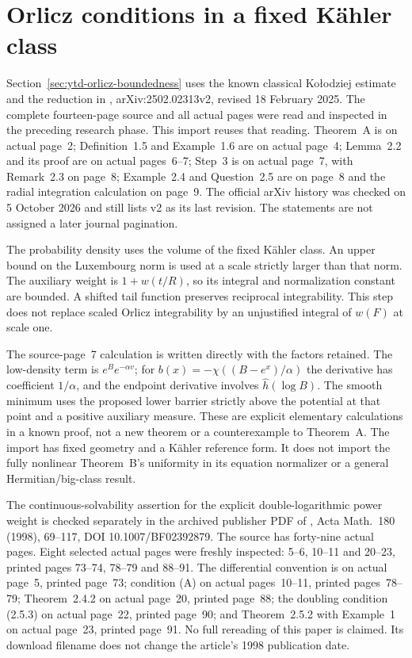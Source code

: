 \section{Orlicz conditions in a fixed K\"ahler class}
\label{sec:provenance-orlicz-K}

Section~\ref{sec:ytd-orlicz-boundedness} uses the known classical
Ko\l odziej estimate and the reduction in
\cite{GuedjLu25FromYauV2}, arXiv:2502.02313v2, revised
18 February 2025. The complete fourteen-page source and all actual
pages were read and inspected in the preceding research phase.
This import reuses that reading. Theorem~A is on actual page~2;
Definition~1.5 and Example~1.6 are on actual page~4;
Lemma~2.2 and its proof are on actual pages~6--7;
Step~3 is on actual page~7, with Remark~2.3 on page~8;
Example~2.4 and Question~2.5 are on page~8 and the radial
integration calculation on page~9. The official arXiv history
was checked on 5 October 2026 and still lists v2 as its last revision.
The statements are not assigned a later journal pagination.

The probability density uses the volume of the fixed K\"ahler class.
An upper bound on the Luxembourg norm is used at a scale strictly
larger than that norm. The auxiliary weight is $1+w(t/R)$, so
its integral and normalization constant are bounded. A shifted
tail function preserves reciprocal integrability. This step does
not replace scaled Orlicz integrability by an unjustified integral
of $w(F)$ at scale one.

The source-page~7 calculation is written directly with the factors
retained. The low-density term is $e^Be^{-\alpha v}$;
for $b(x)=-\chi((B-e^x)/\alpha)$ the derivative has coefficient
$1/\alpha$, and the endpoint derivative involves
$\widehat h(\log B)$. The smooth minimum uses the proposed lower
barrier strictly above the potential at that point and a positive
auxiliary measure. These are explicit elementary calculations in
a known proof, not a new theorem or a counterexample to Theorem~A.
The import has fixed geometry and a K\"ahler reference form.
It does not import the fully nonlinear Theorem~B's uniformity in
its equation normalizer or a general Hermitian/big-class result.

The continuous-solvability assertion for the explicit
double-logarithmic power weight is checked separately in the archived
publisher PDF of \cite{Kol98}, Acta Math.\ 180 (1998), 69--117,
DOI 10.1007/BF02392879. The source has forty-nine actual pages.
Eight selected actual pages were freshly inspected: 5--6,
10--11 and 20--23, printed pages 73--74, 78--79 and 88--91.
The differential convention is on actual page~5, printed page~73;
condition (A) on actual pages~10--11, printed pages~78--79;
Theorem~2.4.2 on actual page~20, printed page~88;
the doubling condition (2.5.3) on actual page~22, printed page~90;
and Theorem~2.5.2 with Example~1 on actual page~23, printed page~91.
No full rereading of this paper is claimed. Its download filename
does not change the article's 1998 publication date.


